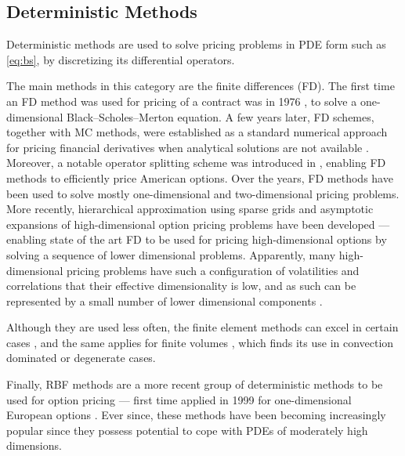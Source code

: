 \documentclass{UUThesisTemplate}
\begin{document}
\subsection{Deterministic Methods}
\par Deterministic methods are used to solve pricing problems in PDE form such as \eqref{eq:bs}, by discretizing its differential operators. 
\par The main methods in this category are the finite differences (FD). The first time an FD method was used for pricing of a contract was in 1976 \cite{brennan1976pricing}, to solve a one-dimensional Black--Scholes--Merton equation. A few years later, FD schemes, together with MC methods, were established as a standard numerical approach for pricing financial derivatives when analytical solutions are not available \cite{brennan1978finite}. Moreover, a notable operator splitting scheme was introduced in \cite{ikonen2004operator}, enabling FD methods to efficiently price American options. Over the years, FD methods have been used to solve mostly one-dimensional and two-dimensional pricing problems. More recently, hierarchical approximation using sparse grids \cite{reisinger2007efficient} and asymptotic expansions \cite{reisinger2015numerical} of high-dimensional option pricing problems have been developed --- enabling state of the art FD \cite{foulon2010adi, haentjens2012adi} to be used for pricing high-dimensional options by solving a sequence of lower dimensional problems. Apparently, many high-dimensional pricing problems have such a configuration of volatilities and correlations that their effective dimensionality is low, and as such can be represented by a small number of lower dimensional components \cite{wang2005high}.
\par Although they are used less often, the finite element methods can excel in certain cases \cite{zvan1998general, forsyth1999finite, heinecke2012highly}, and the same applies for finite volumes \cite{zvan2001finite}, which finds its use in convection dominated or degenerate cases.
\par Finally, RBF methods are a more recent group of deterministic methods to be used for option pricing --- first time applied in 1999 for one-dimensional European options \cite{hon1999radial}. Ever since, these methods have been becoming increasingly popular since they possess potential to cope with PDEs of moderately high dimensions.
%
\end{document}
